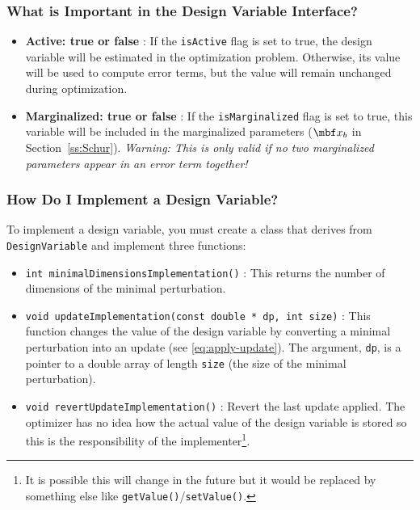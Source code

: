\documentclass[11pt,a4,oneside]{article}
\newcommand{\txt}[1]{{\footnotesize\texttt{#1}}}
\begin{document}
\subsubsection{What is Important in the Design Variable Interface?}
\begin{itemize}
\item {\bf Active: true or false} : If the \txt{isActive} flag is set to true, the design variable will be estimated in the optimization problem. Otherwise, its value will be used to compute error terms, but the value will remain unchanged during optimization.
\item {\bf Marginalized: true or false} : If the \txt{isMarginalized} flag is set to true, this variable will be included in the marginalized parameters ($\mbf x_b$ in Section~\ref{ss:Schur}). {\em Warning: This is only valid if no two marginalized parameters appear in an error term together!}
\end{itemize}
\subsubsection{How Do I Implement a Design Variable?}
To implement a design variable, you must create a class that derives from \txt{DesignVariable} and implement three functions:
\begin{itemize}
\item \txt{int minimalDimensionsImplementation()} : This returns the number of dimensions of the minimal perturbation.
\item \txt{void updateImplementation(const double * dp, int size)} : This function changes the value of the design variable by converting a minimal perturbation into an update (see \eqref{eq:apply-update}). The argument, \txt{dp}, is a pointer to a double array of length \txt{size} (the size of the minimal perturbation).
\item \txt{void revertUpdateImplementation()} : Revert the last update applied. The optimizer has no idea how the actual value of the design variable is stored so this is the responsibility of the implementer\footnote{It is possible this will change in the future but it would be replaced by something else like \txt{getValue()}/\txt{setValue()}.}.
\end{itemize}
\end{document}
